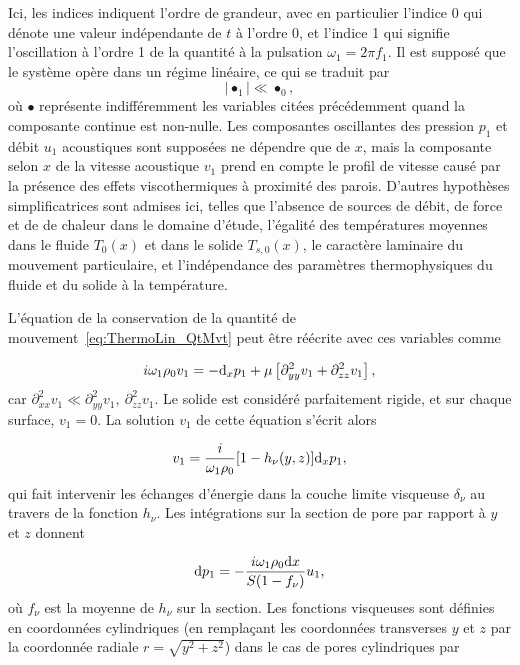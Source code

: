 Ici, les indices indiquent l'ordre de grandeur, avec en particulier l'indice \num{0} qui dénote une valeur indépendante de $t$ à l'ordre \num{0}, et l'indice \num{1} qui signifie l'oscillation à l'ordre \num{1} de la quantité à la pulsation $\omega_1=2\pi f_1$. Il est supposé que le système opère dans un régime linéaire, ce qui se traduit par
\begin{equation}
	\left|\bullet_1\right| \ll \bullet_0,
	\label{eq:ConditionLinearite}
\end{equation}
où $\bullet$ représente indifféremment les variables citées précédemment quand la composante continue est non-nulle. Les composantes oscillantes des pression $p_1$ et débit $u_1$ acoustiques sont supposées ne dépendre que de $x$, mais la composante selon $x$ de la vitesse acoustique $v_1$ prend en compte le profil de vitesse causé par la présence des effets viscothermiques à proximité des parois. D'autres hypothèses simplificatrices sont admises ici, telles que l'absence de sources de débit, de force et de de chaleur dans le domaine d'étude, l'égalité des températures moyennes dans le fluide $T_0(x)$ et dans le solide $T_{s,0}(x)$, le caractère laminaire du mouvement particulaire, et l'indépendance des paramètres thermophysiques du fluide et du solide à la température.\medskip

L'équation de la conservation de la quantité de mouvement~\eqref{eq:ThermoLin_QtMvt} peut être réécrite avec ces variables comme

\begin{equation}
	i\omega_1 \rho_0 v_1 = -\mathrm{d}_x p_1 + \mu\left[\partial^2_{yy} v_1 + \partial^2_{zz}v_1\right],
\end{equation}
car $\partial_{xx}^2 v_1 \ll \partial_{yy}^2 v_1,~\partial_{zz}^2 v_1$. Le solide est considéré parfaitement rigide, et sur chaque surface, $v_1=0$. La solution $v_1$ de cette équation s'écrit alors

\begin{equation}
	v_1 = \frac{i}{\omega_1 \rho_0}[1-h_\nu(y,z)]\mathrm{d}_x p_1,
\end{equation}
qui fait intervenir les échanges d'énergie dans la couche limite visqueuse $\delta_\nu$ au travers de la fonction $h_\nu$. Les intégrations sur la section de pore par rapport à $y$ et $z$ donnent 

\begin{equation}
	\mathrm{d} p_1 = -\frac{i\omega_1 \rho_0 \mathrm{d} x}{S(1-f_\nu)}u_1,
	\label{eq:ThermoLin_dp1}
\end{equation}
où $f_\nu$ est la moyenne de $h_\nu$ sur la section. Les fonctions visqueuses sont définies en coordonnées cylindriques (en remplaçant les coordonnées transverses $y$ et $z$ par la coordonnée radiale $r=\sqrt{y^2+z^2}$) dans le cas de pores cylindriques par~\cite{arnott_general_1991}

